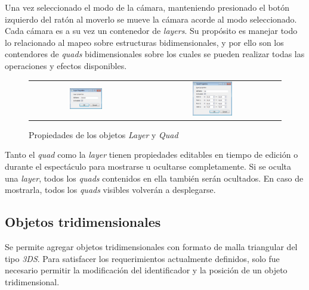Una vez seleccionado el modo de la cámara, manteniendo presionado el botón izquierdo del ratón al moverlo se mueve la cámara acorde al modo seleccionado.
Cada cámara es a su vez un contenedor de \emph{layers}. Su propósito es manejar todo lo relacionado al mapeo sobre estructuras bidimensionales, y por ello son los contendores de \emph{quads} bidimensionales sobre los cuales se pueden realizar todas las operaciones y efectos disponibles.

\begin{figure}
	\begin{center}
		\begin{tabular}[c]{cc}
			\includegraphics[width=0.3\textwidth]{./Cap5_vmt/vmt_layerProperties.png}
				&        
			\includegraphics[width=0.3\textwidth]{./Cap5_vmt/vmt_quadProperties.png}
		\end{tabular}
	\end{center}
	\caption{Propiedades de los objetos \emph{Layer} y \emph{Quad}}
	\label{fig:VMT-LayerQuadProperties}
\end{figure}

Tanto el \emph{quad} como la \emph{layer} tienen propiedades editables en tiempo de edición o durante el espectáculo para mostrarse u ocultarse completamente. Si se oculta una \emph{layer}, todos los \emph{quads} contenidos en ella también serán ocultados. En caso de mostrarla, todos los \emph{quads} visibles volverán a desplegarse.

\subsection{Objetos tridimensionales}

Se permite agregar objetos tridimensionales con formato de malla triangular del tipo \emph{3DS}\cite{3D-Studio}. Para satisfacer los requerimientos actualmente definidos, solo fue necesario permitir la modificación del identificador y la posición de un objeto tridimensional.

